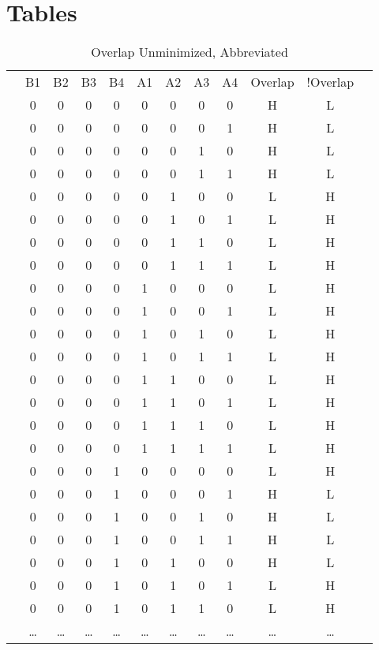 \documentclass[letterpaper,titlepage,oneside]{article}
\begin{document}
\clearpage
\section{Tables}

\begin{table}[h!]
\begin{center}
\caption{Overlap Unminimized, Abbreviated}\label{table:OverLap_Unminimized}
\begin{tabular}{c|c|c|c|c|c|c|c|c|c|c|c}
\cline{2-11}

 & B1 & B2 & B3 & B4 & A1 & A2 & A3 & A4 & Overlap & !Overlap & \\ \cline{2-11}
 & 0 & 0 & 0 & 0 & 0 & 0 & 0 & 0 & H & L &   \\
 & 0 & 0 & 0 & 0 & 0 & 0 & 0 & 1 & H & L &   \\
 & 0 & 0 & 0 & 0 & 0 & 0 & 1 & 0 & H & L &   \\
 & 0 & 0 & 0 & 0 & 0 & 0 & 1 & 1 & H & L &   \\
 & 0 & 0 & 0 & 0 & 0 & 1 & 0 & 0 & L & H &   \\
 & 0 & 0 & 0 & 0 & 0 & 1 & 0 & 1 & L & H &   \\
 & 0 & 0 & 0 & 0 & 0 & 1 & 1 & 0 & L & H &   \\
 & 0 & 0 & 0 & 0 & 0 & 1 & 1 & 1 & L & H &   \\
 & 0 & 0 & 0 & 0 & 1 & 0 & 0 & 0 & L & H &   \\
 & 0 & 0 & 0 & 0 & 1 & 0 & 0 & 1 & L & H &   \\
 & 0 & 0 & 0 & 0 & 1 & 0 & 1 & 0 & L & H &   \\
 & 0 & 0 & 0 & 0 & 1 & 0 & 1 & 1 & L & H &   \\
 & 0 & 0 & 0 & 0 & 1 & 1 & 0 & 0 & L & H &   \\
 & 0 & 0 & 0 & 0 & 1 & 1 & 0 & 1 & L & H &   \\
 & 0 & 0 & 0 & 0 & 1 & 1 & 1 & 0 & L & H &   \\
 & 0 & 0 & 0 & 0 & 1 & 1 & 1 & 1 & L & H &   \\
 & 0 & 0 & 0 & 1 & 0 & 0 & 0 & 0 & L & H &   \\
 & 0 & 0 & 0 & 1 & 0 & 0 & 0 & 1 & H & L &   \\
 & 0 & 0 & 0 & 1 & 0 & 0 & 1 & 0 & H & L &   \\
 & 0 & 0 & 0 & 1 & 0 & 0 & 1 & 1 & H & L &   \\
 & 0 & 0 & 0 & 1 & 0 & 1 & 0 & 0 & H & L &   \\
 & 0 & 0 & 0 & 1 & 0 & 1 & 0 & 1 & L & H &   \\
 & 0 & 0 & 0 & 1 & 0 & 1 & 1 & 0 & L & H &   \\
 & \ldots & \ldots & \ldots & \ldots & \ldots & \ldots & \ldots & \ldots & \ldots & \ldots &  \\

\cline{2-11}
\end{tabular}

\end{center}
\end{table}
\end{document}
